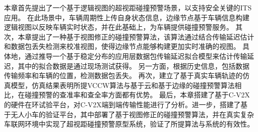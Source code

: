 本章首先提出了一个基于逻辑视图的超视距碰撞预警场景，以支持安全关键的ITS应用。
在此场景中，车辆周期性上传自身状态信息，边缘节点基于车辆信息构建逻辑视图以反映车辆实时状态，并在此基础上，为车辆提供碰撞预警服务。
其次，本章提出了一种基于视图修正的碰撞预警算法，该算法通过结合传输延迟估计和数据包丢失检测来校准视图，使得边缘节点能够构建更加实时准确的视图。
具体地，通过推导一个基于稳定分布的应用层数据包传输延迟拟合模型来估计传输延迟，其中的拟合数据是通过现场测试获得。
另一方面，根据历史信息，包括数据传输频率和车辆的位置，检测数据包丢失。
再次，建立了基于真实车辆轨迹的仿真模型，仿真结果表明所提VCCW算法与基于云和基于边缘的碰撞预警算法相比，在碰撞预警的查准率和查全率方面都有优势。
最后，本章搭建了基于C-V2X的硬件在环试验平台，对C-V2X端到端传输性能进行了分析。进一步，搭建了基于无人小车的验证平台，其中部署了基于视图修正的碰撞预警算法，并在真实复杂车联网环境中实现了超视距碰撞预警原型系统，验证了所提算法与系统的有效性。
